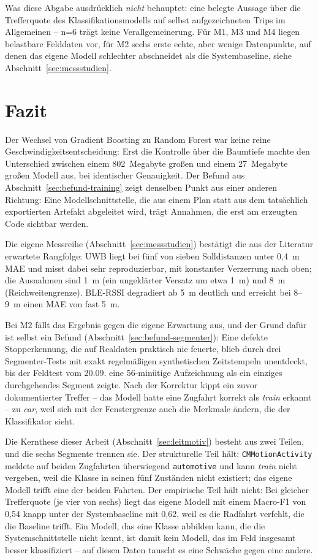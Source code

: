 \documentclass[11pt,a4paper,oneside]{article}
\begin{document}
Was diese Abgabe ausdrücklich \emph{nicht} behauptet: eine belegte Aussage
über die Trefferquote des Klassifikationsmodells auf selbst aufgezeichneten
Trips im Allgemeinen -- n=6 trägt keine Verallgemeinerung. Für M1, M3
und M4 liegen belastbare Felddaten vor, für M2 sechs erste echte, aber
wenige Datenpunkte, auf denen das eigene Modell schlechter abschneidet als
die Systembaseline, siehe Abschnitt~\ref{sec:messstudien}.

\section{Fazit}

Der Wechsel von Gradient Boosting zu Random Forest war keine reine
Geschwindigkeitsentscheidung: Erst die Kontrolle über die Baumtiefe machte
den Unterschied zwischen einem 802~Megabyte großen und einem
27~Megabyte großen Modell aus, bei identischer Genauigkeit. Der
Befund aus Abschnitt~\ref{sec:befund-training} zeigt denselben Punkt aus
einer anderen Richtung: Eine Modellschnittstelle, die aus einem Plan statt
aus dem tatsächlich exportierten Artefakt abgeleitet wird, trägt Annahmen,
die erst am erzeugten Code sichtbar werden.

Die eigene Messreihe (Abschnitt~\ref{sec:messstudien}) bestätigt die aus
der Literatur erwartete Rangfolge: UWB liegt bei fünf von sieben
Solldistanzen unter 0{,}4~m MAE und misst dabei sehr reproduzierbar, mit
konstanter Verzerrung nach oben; die Ausnahmen sind 1~m (ein ungeklärter
Versatz um etwa 1~m) und 8~m (Reichweitengrenze). BLE-RSSI degradiert ab
5~m deutlich und erreicht bei 8--9~m einen MAE von fast 5~m.

Bei M2 fällt das Ergebnis gegen die eigene Erwartung aus, und der Grund
dafür ist selbst ein Befund (Abschnitt~\ref{sec:befund-segmenter}): Eine
defekte Stopperkennung, die auf Realdaten praktisch nie feuerte, blieb
durch drei Segmenter-Tests mit exakt regelmäßigen synthetischen
Zeitstempeln unentdeckt, bis der Feldtest vom 20.09. eine 56-minütige
Aufzeichnung als ein einziges durchgehendes Segment zeigte. Nach der
Korrektur kippt ein zuvor dokumentierter Treffer -- das Modell hatte eine
Zugfahrt korrekt als \emph{train} erkannt -- zu \emph{car}, weil sich mit
der Fenstergrenze auch die Merkmale ändern, die der Klassifikator sieht.

Die Kernthese dieser Arbeit (Abschnitt~\ref{sec:leitmotiv}) besteht aus
zwei Teilen, und die sechs Segmente trennen sie. Der strukturelle Teil
hält: \texttt{CMMotionActivity} meldete auf beiden Zugfahrten überwiegend
\texttt{automotive} und kann \emph{train} nicht vergeben, weil die Klasse in
seinen fünf Zuständen nicht existiert; das eigene Modell trifft eine der
beiden Fahrten. Der empirische Teil hält nicht: Bei gleicher Trefferquote
(je vier von sechs) liegt das eigene Modell mit einem Macro-F1 von 0{,}54
knapp unter der Systembaseline mit 0{,}62, weil es die Radfahrt verfehlt,
die die Baseline trifft. Ein Modell, das eine Klasse abbilden kann, die die
Systemschnittstelle nicht kennt, ist damit kein Modell, das im Feld
insgesamt besser klassifiziert -- auf diesen Daten tauscht es eine Schwäche
gegen eine andere.
\end{document}
